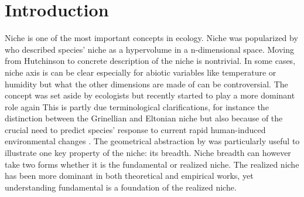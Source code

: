 \section*{Introduction}
Niche is one of the most important concepts in ecology.
Niche was popularized by \citet{Hutchinson1957} who described species' niche as a hypervolume in a n-dimensional space.
Moving from Hutchinson to concrete description of the niche is nontrivial.
In some cases, niche axis is can be clear especially for abiotic variables like temperature or humidity but what the other dimensions are made of can be controversial.
The concept was set aside by ecologists but recently started to play a more dominant role again %
This is partly due terminological clarifications, for instance the distinction between the Grinellian and Eltonian niche \citep{Chase2003} but also because of the crucial need to predict species' response to current rapid human-induced environmental changes \citep[e.g.,][]{Parmesan2006, Kearney2009}. %
The geometrical abstraction by \citet{Hutchinson1957} was particularly useful to illustrate one key property of the niche: its breadth.
Niche breadth can however take two forms whether it is the fundamental or realized niche.
The realized niche has been more dominant in both theoretical and empirical works, yet understanding fundamental is a foundation of the realized niche.


